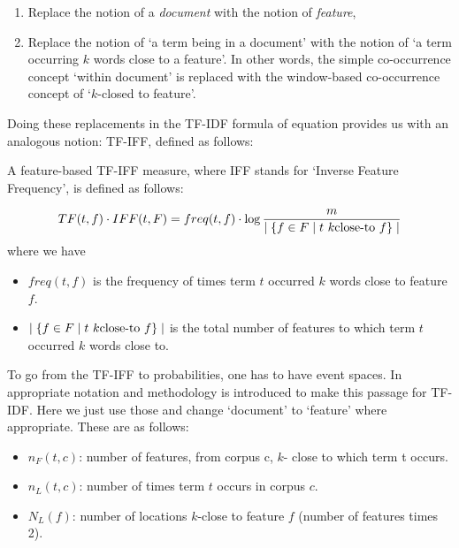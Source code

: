 \begin{enumerate}
\item   Replace the notion of a  \emph{document}  with the notion of  \emph{feature}, 
\item  Replace the notion of `a term being in a document'  with the notion of `a term occurring $k$ words close to a feature'.  In other words,  the  simple co-occurrence concept `within document' is replaced with the window-based co-occurrence concept of  `$k$-closed to feature'. 
\end{enumerate}

Doing these replacements in the TF-IDF formula of equation  \label {tf-idf} provides us with an analogous notion:   TF-IFF, defined as follows:

\begin{definition}
A feature-based TF-IFF  measure, where IFF stands for `Inverse Feature Frequency', is defined as follows:

\begin{equation}
\label{tf-iff}
TF(t,f) \cdot IFF(t, F) = freq(t, f) \cdot \log{{m} \over {\mid \{f \in F \mid t  \ k\textmd{close-to} \ f \} \mid}}
\end{equation}
where we have
\begin{itemize}
\item $freq(t, f)$ is the frequency of times term $t$ occurred $k$ words close to feature $f$.
\item $\mid \{f \in F \mid t  \ k\textmd{close-to} \ f \} \mid$ is the total number of features to which term $t$ occurred $k$ words close to. 
\end{itemize}

\end{definition}

To go from the TF-IFF to probabilities, one has to have event spaces.  In  \cite{ThomasBook} appropriate notation and methodology is introduced to make this passage for TF-IDF. Here we just use those and change `document' to `feature' where appropriate.  These are as follows:

\begin{itemize}
\item $n_F(t,c)$: number of features,  from corpus c,  $k$- close to which term t occurs.
\item $n_L(t,c)$: number of times term $t$ occurs in corpus $c$.
\item $N_L(f)$: number of locations $k$-close to feature $f$ (number of features times 2).
\end{itemize}

